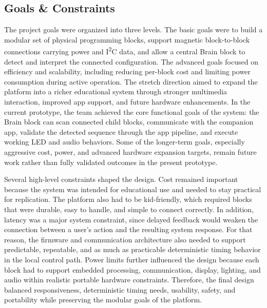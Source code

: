 \documentclass[10pt, conference]{IEEEtran}
\begin{document}
\subsection{Goals \& Constraints}

The project goals were organized into three levels. The basic goals were to build a modular set of physical programming blocks, support magnetic block-to-block connections carrying power and I\textsuperscript{2}C data, and allow a central Brain block to detect and interpret the connected configuration. The advanced goals focused on efficiency and scalability, including reducing per-block cost and limiting power consumption during active operation. The stretch direction aimed to expand the platform into a richer educational system through stronger multimedia interaction, improved app support, and future hardware enhancements. In the current prototype, the team achieved the core functional goals of the system: the Brain block can scan connected child blocks, communicate with the companion app, validate the detected 
sequence through the app pipeline, and execute working LED and audio behaviors. Some of the longer-term goals, especially aggressive cost, power, and advanced hardware expansion targets, remain future work rather than fully validated outcomes in the present prototype. 

Several high-level constraints shaped the design. Cost remained important because the system was intended for educational use and needed to stay practical for replication. The platform also had to be kid-friendly, which required blocks that were durable, easy to handle, and simple to connect correctly. In addition, latency was a major system constraint, since delayed feedback would weaken the connection between a user's action and the resulting system response. For that reason, the firmware and communication architecture also needed to support predictable, repeatable, and as much as practicable deterministic timing behavior in the local control path. Power limits further influenced the design because each block had to support embedded 
processing, communication, display, lighting, and audio within realistic portable hardware constraints. Therefore, the final design balanced responsiveness, deterministic timing needs, usability, safety, and portability while preserving the modular goals of the platform. 
\end{document}
